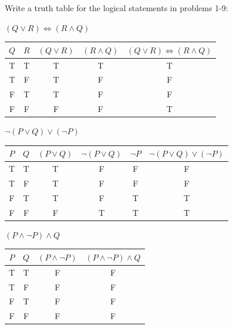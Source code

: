 \documentclass[DIN, pagenumber=false, fontsize=11pt, parskip=half]{scrartcl}
\begin{document}
\begin{exercise}{}
    Write a truth table for the logical statements in problems 1-9:
\end{exercise}

\begin{problems}
    \problem $(Q \lor R) \iff (R \land Q)$
    \answer 
    \begin{center}
        \begin{tabular}{ccccc}
            $Q$ & $R$ & $(Q \lor R)$ & $(R \land Q)$ & $(Q \lor R) \iff (R \land Q)$\\
            \midrule
            T & T & T & T & T\\  
            T & F & T & F & F\\
            F & T & T & F & F\\ 
            F & F & F & F & T 
        \end{tabular}
    \end{center}

    \problem $\lnot (P \lor Q) \lor (\lnot P)$
    \answer
    \begin{center}
        \begin{tabular}{cccccc}
            $P$ & $Q$ & $(P \lor Q)$ & $\lnot(P \lor Q)$ & $\lnot P$ & $\lnot(P \lor Q) \lor (\lnot P)$\\ 
            \midrule
            T & T & T & F & F & F\\ 
            T & F & T & F & F & F\\ 
            F & T & T & F & T & T\\ 
            F & F & F & T & T & T
        \end{tabular}
    \end{center}

    \problem $(P \land \lnot P) \land Q$
    \answer
    \begin{center}
        \begin{tabular}{cccc}
            $P$ & $Q$ & $(P \land \lnot P)$ & $(P \land \lnot P) \land Q$\\ 
            \midrule
            T & T & F & F\\ 
            T & F & F & F\\ 
            F & T & F & F\\ 
            F & F & F & F
        \end{tabular}
    \end{center}


\end{problems}
\end{document}
